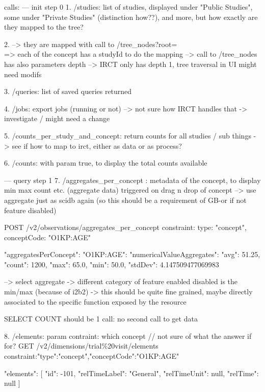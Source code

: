 calls:
--- init step 0
1. /studies: list of studies, displayed under "Public Studies", some under "Private Studies" (distinction how??), and more, but how exactly are they mapped to the tree?

2. --> they are mapped with call to /tree\_nodes?root=\\ => each of the concept has a studyId to do the mapping
--> call to /tree\_nodes has also parameters depth --> IRCT only has depth 1, tree traversal in UI might need modifs

3. /queries: list of saved queries returned

4. /jobs: export jobs (running or not) --> not sure how IRCT handles that -> investigate / might need a change

5. /counts\_per\_study\_and\_concept: return counts for all studies / sub things -> see if how to map to irct, either as data or as process?

6. /counts: with param true, to display the total counts available

--- query step 1
7. /aggregates\_per\_concept : metadata of the concept, to display min max count etc. (aggregate data)
triggered on drag n drop of concept
--> use aggregate just as scidb again (so this should be a requirement of GB-or if not feature disabled)

POST /v2/observations/aggregates\_per\_concept
{constraint: {type: "concept", conceptCode: "O1KP:AGE"}}

{
  "aggregatesPerConcept": {
    "O1KP:AGE": {
      "numericalValueAggregates": {
        "avg": 51.25,
        "count": 1200,
        "max": 65.0,
        "min": 50.0,
        "stdDev": 4.147509477069983
      }
    }
  }
}

--> select aggregate
-> different category of feature enabled disabled is the min/max (because of i2b2) -> this should be quite fine grained, maybe directly associated to the specific function exposed by the resource

SELECT COUNT should be 1 call: no second call to get data


8. /elements: param contraint: which concept // not sure of what the answer if for?
GET /v2/dimensions/trial\%20visit/elements
constraint:{"type":"concept","conceptCode":"O1KP:AGE"}

{
  "elements": 
  [
    {
      "id": -101,
      "relTimeLabel": "General",
      "relTimeUnit": null,
      "relTime": null
    }
  ]
}


